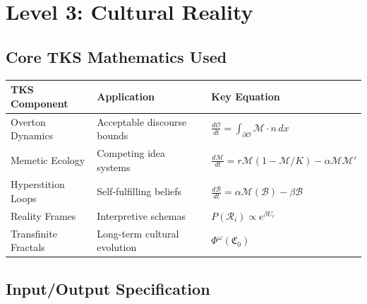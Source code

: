 \documentclass[11pt,twoside]{book}
\renewcommand{\arraystretch}{1.2}
\newcommand{\TransFrac}[1]{\Phi^{#1}}
\newcommand{\Cultural}{\mathfrak{C}}
\newcommand{\Overton}{\mathcal{O}}
\newcommand{\Memetic}{\mathcal{M}}
\begin{document}
\chapter{Level 3: Cultural Reality}
\label{ch:level3-spec}

\section{Core TKS Mathematics Used}

\begin{center}
\renewcommand{\arraystretch}{1.4}
\begin{tabularx}{\textwidth}{>{\raggedright\arraybackslash}p{3cm}|>{\raggedright\arraybackslash}X|>{\raggedright\arraybackslash}p{4cm}}
\toprule
\textbf{TKS Component} & \textbf{Application} & \textbf{Key Equation} \\
\midrule
Overton Dynamics & Acceptable discourse bounds & $\frac{d\Overton}{dt} = \int_{\partial\Overton} \Memetic \cdot n \, dx$ \\
Memetic Ecology & Competing idea systems & $\frac{d\Memetic}{dt} = r\Memetic(1-\Memetic/K) - \alpha\Memetic\Memetic'$ \\
Hyperstition Loops & Self-fulfilling beliefs & $\frac{d\mathcal{B}}{dt} = \alpha\mathcal{M}(\mathcal{B}) - \beta\mathcal{B}$ \\
Reality Frames & Interpretive schemas & $P(\mathcal{R}_i) \propto e^{\beta U_i}$ \\
Transfinite Fractals & Long-term cultural evolution & $\TransFrac{\omega}(\Cultural_0)$ \\
\bottomrule
\end{tabularx}
\end{center}

\section{Input/Output Specification}
\end{document}
